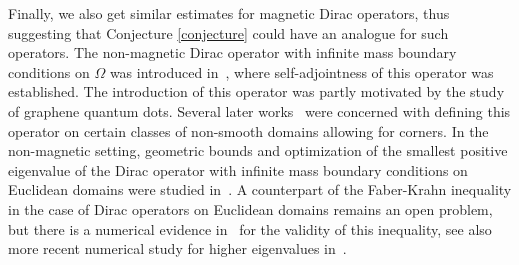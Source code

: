 \documentclass[11pt,a4paper]{amsart}
\newcounter{counter_a}
\numberwithin{figure}{section}
\numberwithin{equation}{section}
\theoremstyle{plain}%
\theoremstyle{remark}
\theoremstyle{plain}
\begin{document}
\medskip
Finally, we also get similar estimates for magnetic Dirac operators, thus suggesting that Conjecture \ref{conjecture} could have an analogue for such operators.
The non-magnetic Dirac operator with infinite mass boundary conditions
on $\Omega$ was introduced in~\cite{BFSV17a},
where self-adjointness of this operator was established. The introduction of this operator was partly motivated by the study of graphene quantum dots. 
Several later
works~\cite{CL20, CL24, LO18, PV21} were concerned with defining this operator on certain classes of non-smooth domains allowing
for corners.
In the non-magnetic setting, geometric bounds
and optimization of the smallest positive eigenvalue of the Dirac operator
with infinite mass boundary conditions on Euclidean domains were studied in~\cite{ABLO21,ABK24, BFSV17b,  BK22, DMS25, LO19}.
A counterpart of the Faber-Krahn inequality in the case of Dirac
operators on Euclidean domains remains an open problem, but
there is a numerical evidence in~\cite{ABLO21} for the validity
of this inequality, see also more recent numerical
study for higher eigenvalues in~\cite{ABK24}.  
\end{document}
